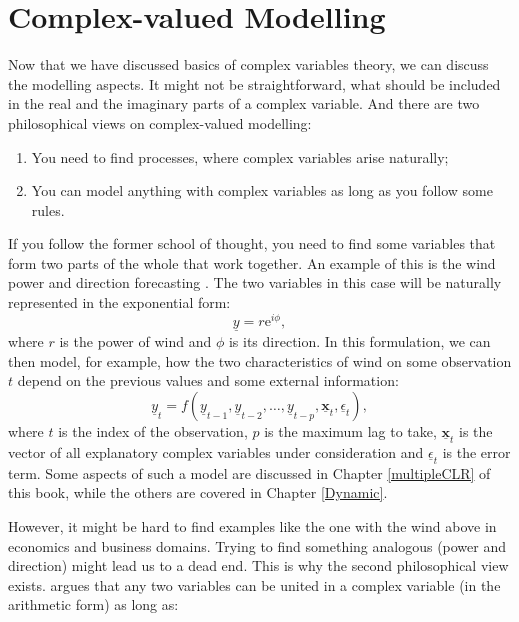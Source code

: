 \documentclass[
]{book}
\providecommand{\tightlist}{%
  \setlength{\itemsep}{0pt}\setlength{\parskip}{0pt}}
\begin{document}
\hypertarget{complexModelling}{%
\section{Complex-valued Modelling}\label{complexModelling}}

Now that we have discussed basics of complex variables theory, we can discuss the modelling aspects. It might not be straightforward, what should be included in the real and the imaginary parts of a complex variable. And there are two philosophical views on complex-valued modelling:

\begin{enumerate}
\def\labelenumi{\arabic{enumi}.}
\tightlist
\item
  You need to find processes, where complex variables arise naturally;
\item
  You can model anything with complex variables as long as you follow some rules.
\end{enumerate}

If you follow the former school of thought, you need to find some variables that form two parts of the whole that work together. An example of this is the wind power and direction forecasting \citep{Goh2004, Javidi2008, Knight2019}. The two variables in this case will be naturally represented in the exponential form:
\begin{equation*}
    \underline{y} = r \mathrm{e}^{i \phi} ,
\end{equation*}
where \(r\) is the power of wind and \(\phi\) is its direction. In this formulation, we can then model, for example, how the two characteristics of wind on some observation \(t\) depend on the previous values and some external information:
\begin{equation*}
    \underline{y}_t = f(\underline{y}_{t-1}, \underline{y}_{t-2}, \dots, \underline{y}_{t-p}, \underline{\mathbf{x}}_t, \underline{\epsilon}_t),
\end{equation*}
where \(t\) is the index of the observation, \(p\) is the maximum lag to take, \(\underline{\mathbf{x}}_t\) is the vector of all explanatory complex variables under consideration and \(\underline{\epsilon}_t\) is the error term. Some aspects of such a model are discussed in Chapter \ref{multipleCLR} of this book, while the others are covered in Chapter \ref{Dynamic}.

However, it might be hard to find examples like the one with the wind above in economics and business domains. Trying to find something analogous (power and direction) might lead us to a dead end. This is why the second philosophical view exists. \citet{Svetunkov2012} argues that any two variables can be united in a complex variable (in the arithmetic form) as long as:
\end{document}
